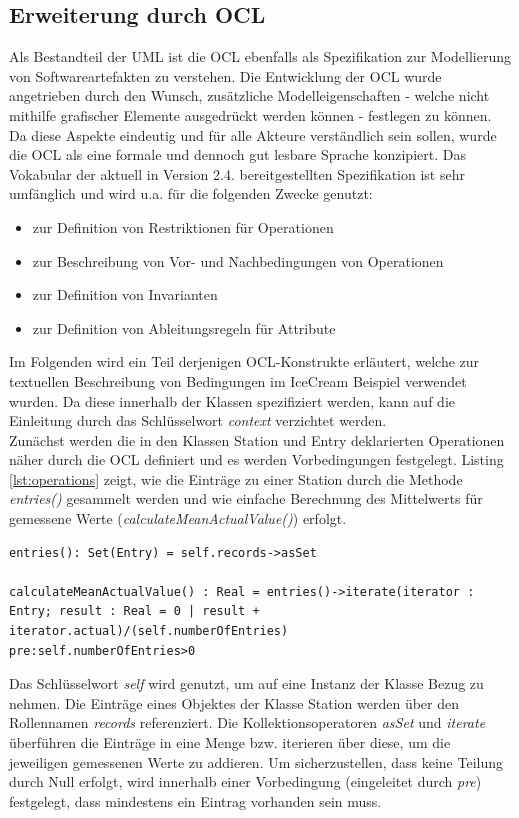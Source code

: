\documentclass[a4paper,twoside]{article}
\begin{document}
\subsection{Erweiterung durch OCL} 
\label{ssec:ocl}
Als Bestandteil der UML ist die OCL ebenfalls als Spezifikation zur Modellierung von Softwareartefakten zu verstehen. Die Entwicklung der OCL wurde angetrieben durch den Wunsch, zusätzliche Modelleigenschaften - welche nicht mithilfe grafischer Elemente ausgedrückt werden können - festlegen zu können. \cite[S.5f]{OCLFormal} Da diese Aspekte eindeutig und für alle Akteure verständlich sein sollen, wurde die OCL als eine formale und dennoch gut lesbare Sprache konzipiert. Das Vokabular der aktuell in Version 2.4. bereitgestellten Spezifikation ist sehr umfänglich und wird u.a. für die folgenden Zwecke genutzt: \begin{itemize}
\item zur Definition von Restriktionen für Operationen
\item zur Beschreibung von Vor- und Nachbedingungen von Operationen 
\item zur Definition von Invarianten
\item zur Definition von Ableitungsregeln für Attribute
\end{itemize} 
Im Folgenden wird ein Teil derjenigen OCL-Konstrukte erläutert, welche zur textuellen Beschreibung von Bedingungen im IceCream Beispiel verwendet wurden. Da diese innerhalb der Klassen spezifiziert werden, kann auf die Einleitung durch das Schlüsselwort \textit{context} verzichtet werden.  \\
Zunächst werden die in den Klassen Station und Entry deklarierten Operationen näher durch die OCL definiert und es werden Vorbedingungen festgelegt. Listing \ref{lst:operations} zeigt, wie die Einträge zu einer Station durch die Methode \textit{entries()} gesammelt werden und wie einfache Berechnung des Mittelwerts für gemessene Werte (\textit{calculateMeanActualValue()}) erfolgt.  
\begin{lstlisting}[caption={OCL-erweiterte Operationen der Klasse Station},label=lst:operations]
entries(): Set(Entry) = self.records->asSet

calculateMeanActualValue() : Real = entries()->iterate(iterator : Entry; result : Real = 0 | result + iterator.actual)/(self.numberOfEntries) 			pre:self.numberOfEntries>0
\end{lstlisting}
Das Schlüsselwort \textit{self} wird genutzt, um auf eine Instanz der Klasse Bezug zu nehmen. Die Einträge eines Objektes der Klasse Station werden über den Rollennamen \textit{records} referenziert. Die Kollektionsoperatoren \textit{asSet} und \textit{iterate} überführen die Einträge in eine Menge bzw. iterieren über diese, um die jeweiligen gemessenen Werte zu addieren. Um sicherzustellen, dass keine Teilung durch Null erfolgt, wird innerhalb einer Vorbedingung (eingeleitet durch \textit{pre}) festgelegt, dass mindestens ein Eintrag vorhanden sein muss. 
\end{document}
